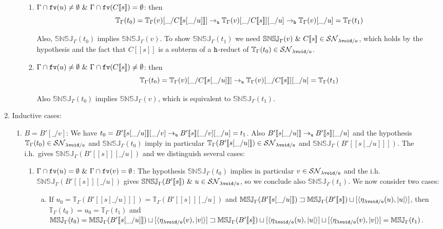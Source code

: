 \documentclass{LMCS}
\renewcommand{\>}{\rightarrow}
\def\lam{\lambda}
\def\Gam{\Gamma}
\newcommand{\Rew}[1]{\rightarrow_{#1}}
\newcommand{\SN}[1]{\mathcal{SN}_{#1}}
\newcommand{\multiset}[1]{ [ #1 ] }
\newcommand{\pair}[2]{\langle #1, #2 \rangle}
\newcommand{\fv}[1]{{\tt fv}(#1)}
\newcommand{\ems}{\emptyset}
\newcommand{\ih}{i.h.}
\newcommand{\unboxed}{{\tt u}}
\newcommand{\modulo}[2]{#1/#2}
\newcommand{\osymb}{{\tt o}}
\newcommand{\aux}{{\tt void}}
\newcommand{\lauxm}{\lam\modulo{ \aux }{ \osymb }}
\newcommand{\New}{{\tt h}}
\newcommand{\snsudd}[2]{\mathbb{SNSJ}_{#1}(#2)}
\newcommand{\ctx}[2]{#1 [ \! [#2] \! ]}
\newcommand{\etamd}[2]{\mathbb{MSJ}_{#1}(#2)}
\newcommand{\surf}[2]{\mathbb{T}_{#1}(#2)}
\newcommand{\void}{\_}
\newcommand{\gm}{\sqsupset}
\begin{document}
\begin{enumerate}[$\bullet$]
\begin{enumerate}[$-$]
\begin{enumerate}[(1)]
 \item \emph{$\Gam\cap\fv{u}\neq\ems\ \&\  \Gam\cap\fv{\ctx{C}{s}}=\ems$}: then
   \[ \surf{\Gam}{t_0}=\surf{\Gam}{v}[\void/\ctx{C}{s[\void/u]}]\Rew{\unboxed}\surf{\Gam}{v}[\void/\ctx{C}{s}][\void/u]\Rew{\New}\surf{\Gam}{v}[\void/u]=\surf{\Gam}{t_1}\]

   Also,  
   $\snsudd{\Gam}{t_0}$ implies  $\snsudd{\Gam}{v}$. To show
   $\snsudd{\Gam}{t_1}$ we need 
   $\snsudd{\Gam}{v}\ \&\ \ctx{C}{s}\in\SN{\lauxm}$, which holds
   by the hypothesis and the fact that $\ctx{C}{s}$ is a subterm of a $\New$-reduct of 
   $\surf{\Gam}{t_0} \in \SN{\lauxm}$. 


\item \emph{$\Gam\cap\fv{u}\neq\ems\ \&\  \Gam\cap\fv{\ctx{C}{s}}\neq\ems$}: then
  \[ \surf{\Gam}{t_0}=\surf{\Gam}{v}[\void/\ctx{C}{s[\void/u]}]\Rew{\unboxed}\surf{\Gam}{v}[\void/\ctx{C}{s}][\void/u]=\surf{\Gam}{t_1}\]

  Also 
  $\snsudd{\Gam}{t_0}$ implies  $\snsudd{\Gam}{v}$, which is equivalent to 
  $\snsudd{\Gam}{t_1}$. 

\end{enumerate}
\end{enumerate}
\item Inductive cases:
\begin{enumerate}[$-$]

\item $B =B'[\void/v]$: 
  We have $t_0=\ctx{B'}{s[\void/u]}[\void/v] \Rew{\unboxed} \ctx{B'}{s}[\void/v][\void/u] = t_1$.
  Also 
  $\ctx{B'}{s[\void/u]} \Rew{\unboxed} \ctx{B'}{s}[\void/u]$ and the hypothesis
  $\surf{\Gam}{t_0} \in \SN{\lauxm}$  and $\snsudd{\Gam}{t_0}$ imply  in particular
  $\surf{\Gam}{\ctx{B'}{s[\void/u]}} \in \SN{\lauxm}$ and $\snsudd{\Gam}{\ctx{B'}{s[\void/u]}}$.
  The \ih\ gives $\snsudd{\Gam}{\ctx{B'}{s}[\void/u]}$ and we distinguish 
  several  cases: 
  \begin{enumerate}[(1)]
  \item \emph{$\Gam\cap\fv{u}=\ems\ \&\ \Gam\cap\fv{v}=\ems$}: 
        The hypothesis  $\snsudd{\Gam}{t_0}$ implies in particular
        $v \in \SN{\lauxm}$ and the \ih\ 
        $\snsudd{\Gam}{\ctx{B'}{s}[\void/u]}$ gives
        $\snsudd{\Gam}{\ctx{B'}{s}}\ \&\ u \in \SN{\lauxm}$, so 
        we conclude also $\snsudd{\Gam}{t_1}$. We now consider two cases:
        \begin{enumerate}[(a)]
        \item If $u_0=\surf{\Gam}{\ctx{B'}{s[\void/u]}} = \surf{\Gam}{\ctx{B'}{s}[\void/u]}$
              and $\etamd{\Gam}{\ctx{B'}{s[\void/u]}}  \gm \etamd{\Gam}{\ctx{B'}{s}} \sqcup
                  \multiset{\pair{\eta_{\lauxm}(u)}{|u|}}$, 
        then $\surf{\Gam}{t_0} = u_0 =              \surf{\Gam}{t_1}$ and 
        $\etamd{\Gam}{t_0} = \etamd{\Gam}{\ctx{B'}{s[\void/u]}}  \sqcup
                  \multiset{\pair{\eta_{\lauxm}(v)}{|v|}} \gm \etamd{\Gam}{\ctx{B'}{s}} \sqcup
                  \multiset{\pair{\eta_{\lauxm}(u)}{|u|}} \sqcup
                  \multiset{\pair{\eta_{\lauxm}(v)}{|v|}} = \etamd{\Gam}{t_1}$.
        

\end{enumerate}
\end{enumerate}
\end{enumerate}
\end{enumerate}
\end{document}
